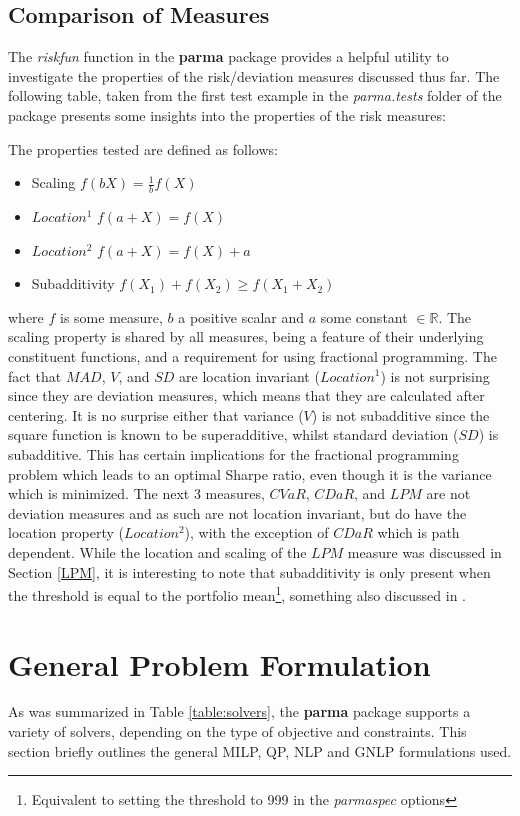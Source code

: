 \subsection{Comparison of Measures}\label{comparison}
The \emph{riskfun} function in the \textbf{parma} package provides a helpful utility
to investigate the properties of the risk/deviation measures discussed thus far. The
following table, taken from the first test example in the \emph{parma.tests} folder of the
package presents some insights into the properties of the risk measures:

The properties tested are defined as follows:
\begin{itemize}
\item Scaling $f(bX)=\frac{1}{b}f(X)$
\item $Location^{1}$ $f(a+X)=f(X)$
\item $Location^{2}$ $f(a+X)=f(X)+a$
\item Subadditivity $f(X_1)+f(X_2)\ge f(X_1+X_2)$
\end{itemize}
where $f$ is some measure, $b$ a positive scalar and $a$ some constant $\in \mathbb{R}$.
The scaling property is shared by all measures, being a feature of their underlying constituent functions,
and a requirement for using fractional programming. The fact that $MAD$, $V$, and $SD$ are location
invariant ($Location^{1}$) is not surprising since they are deviation measures, which means that they
are calculated after centering. It is no surprise either that variance ($V$) is not subadditive since
the square function is known to be superadditive,  whilst standard deviation ($SD$) is subadditive. This has
certain implications for the fractional programming problem which leads to an optimal Sharpe ratio, even
though it is the variance which is minimized. The next 3 measures, $CVaR$, $CDaR$, and $LPM$ are not
deviation measures and as such are not location invariant, but do have the location property ($Location^{2}$),
with the exception of $CDaR$ which is path dependent. While the location and scaling of the $LPM$ measure was
discussed in Section \ref{LPM}, it is interesting to note that subadditivity is only present when
the threshold is equal to the portfolio mean\footnote{Equivalent to setting the threshold to 999 in
the \emph{parmaspec} options }, something also discussed in .
\section{General Problem Formulation}\label{sec:3}
As was summarized in Table \ref{table:solvers}, the \textbf{parma} package
supports a variety of solvers, depending on the type of objective and
constraints. This section briefly outlines the general MILP, QP, NLP and GNLP
formulations used.
